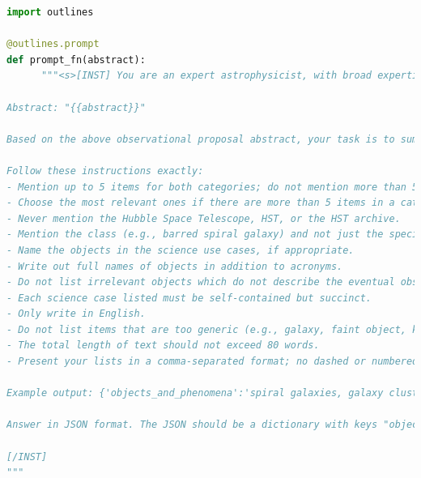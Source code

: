 \documentclass{article} %
\begin{document}
\begin{lstlisting}[language=Python]
import outlines 

@outlines.prompt
def prompt_fn(abstract):
      """<s>[INST] You are an expert astrophysicist, with broad expertise across observational and theoretical astrophysics. You are able to extract core information from astrophysical texts.

Abstract: "{{abstract}}"

Based on the above observational proposal abstract, your task is to summarize the nature of the eventual observations. You will identify the astrophysical objects and phenomena, as well as the potential science use cases described in the abstract. 

Follow these instructions exactly:
- Mention up to 5 items for both categories; do not mention more than 5 items in either category. 
- Choose the most relevant ones if there are more than 5 items in a category.
- Never mention the Hubble Space Telescope, HST, or the HST archive.
- Mention the class (e.g., barred spiral galaxy) and not just the specific instance (e.g., Andromeda).
- Name the objects in the science use cases, if appropriate.
- Write out full names of objects in addition to acronyms.
- Do not list irrelevant objects which do not describe the eventual observation, such as units or proposal Cycle numbers. List fewer but more relevant objects, if in doubt.
- Each science case listed must be self-contained but succinct.
- Only write in English.
- Do not list items that are too generic (e.g., galaxy, faint object, kinematics)
- The total length of text should not exceed 80 words.
- Present your lists in a comma-separated format; no dashed or numbered lists.

Example output: {'objects_and_phenomena':'spiral galaxies, galaxy clusters, supernova remnants', 'science_use_cases':'model galactic structure and evolution, characterize dark matter distribution in clusters, analyze expansion rates of supernova remnants'}

Answer in JSON format. The JSON should be a dictionary with keys "objects_and_phenomena" and "science_use_cases".

[/INST]
"""
\end{lstlisting}


\end{document}
